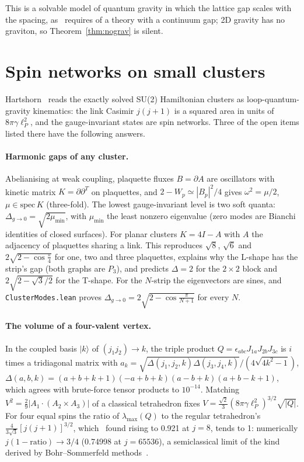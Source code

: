 \documentclass[aps,prd,twocolumn,superscriptaddress,nofootinbib]{revtex4-2}
\theoremstyle{remark}
\begin{document}
This is a solvable model of quantum gravity in which the lattice gap scales with the spacing, as~\cite{4YM}
requires of a theory with a continuum gap; 2D gravity has no graviton, so Theorem~\ref{thm:nograv} is silent.

\section{Spin networks on small clusters}

Hartshorn~\cite{BHqg} reads the exactly solved SU(2) Hamiltonian clusters as loop-quantum-gravity kinematics: the
link Casimir $j(j+1)$ is a squared area in units of $8\pi\gamma\ell_P^2$, and the gauge-invariant states are spin
networks. Three of the open items listed there have the following answers.

\paragraph{Harmonic gaps of any cluster.} Abelianising at weak coupling, plaquette fluxes $B=\partial A$ are
oscillators with kinetic matrix $K=\partial\partial^T$ on plaquettes, and $2-W_p\simeq|B_p|^2/4$ gives
$\omega^2=\mu/2$, $\mu\in\mathrm{spec}\,K$ (three-fold). The lowest gauge-invariant level is two soft quanta:
$\Delta_{g\to0}=\sqrt{2\mu_{\min}}$, with $\mu_{\min}$ the least nonzero eigenvalue (zero modes are Bianchi
identities of closed surfaces). For planar clusters $K=4I-A$ with $A$ the adjacency of plaquettes sharing a link.
This reproduces $\sqrt8$, $\sqrt6$ and $2\sqrt{2-\cos\frac\pi4}$ for one, two and three plaquettes, explains why the
L-shape has the strip's gap (both graphs are $P_3$), and predicts $\Delta=2$ for the $2\times2$ block and
$2\sqrt{2-\sqrt3/2}$ for the T-shape. For the $N$-strip the eigenvectors are sines, and \texttt{ClusterModes.lean}
proves $\Delta_{g\to0}=2\sqrt{2-\cos\frac{\pi}{N+1}}$ for every $N$.

\paragraph{The volume of a four-valent vertex.} In the coupled basis $|k\rangle$ of $(j_1j_2)\to k$, the triple
product $Q=\epsilon_{abc}J_{1a}J_{2b}J_{3c}$ is $i$ times a tridiagonal matrix with
$a_k=\sqrt{\Delta(j_1,j_2,k)\Delta(j_3,j_4,k)}/(4\sqrt{4k^2-1})$,
$\Delta(a,b,k)=(a+b+k+1)(-a+b+k)(a-b+k)(a+b-k+1)$, which agrees with brute-force tensor products to $10^{-14}$.
Matching $V^2=\frac29|A_1\cdot(A_2\times A_3)|$ of a classical tetrahedron fixes
$V=\frac{\sqrt2}{3}(8\pi\gamma\ell_P^2)^{3/2}\sqrt{|Q|}$. For four equal spins the ratio of $\lambda_{\max}(Q)$ to
the regular tetrahedron's $\frac{4}{3\sqrt3}[j(j+1)]^{3/2}$, which~\cite{BHqg} found rising to 0.921 at $j=8$,
tends to 1: numerically $j(1-\text{ratio})\to3/4$ (0.74998 at $j=65536$), a semiclassical limit of the kind
derived by Bohr--Sommerfeld methods~\cite{BH}.
\end{document}
